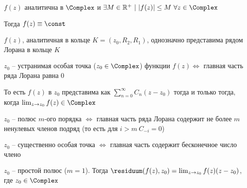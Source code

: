 \documentclass[12pt]{article}
\begin{document}
\begin{MyTheorem}
     $f(z)$ аналитична в $\Complex$ и $\exists M \in \Real^+ \ | \ |f(z)| \leq M \ \forall z \in \Complex$

    Тогда $f(z) \equiv \const$
\end{MyTheorem}

\begin{MyTheorem}
    $f(z)$, аналитичная в кольце $K = (z_0, R_2, R_1)$, однозначно представима рядом Лорана в кольце $K$
\end{MyTheorem}

\begin{MyTheorem}
     $z_0$ -- устранимая особая точка ($z_0 \in \Complex$) функции $f(z) \Longleftrightarrow$ главная часть ряда Лорана равна 0
    
    То есть $f(z)$ в $z_0$ представима как $\sum_{n = 0}^\infty C_n (z - z_0)$ тогда и только тогда, когда $\lim_{z \to z_0} f(z) \in \Complex$
\end{MyTheorem}

\begin{MyTheorem}
     $z_0$ -- полюс $m$-ого порядка $\Longleftrightarrow$ главная часть ряда Лорана содержит не более $m$ ненулевых членов подряд (то есть для $i > m \ C_{-i} = 0$) 
\end{MyTheorem}

\begin{MyTheorem}
     $z_0$ -- существенно особая точка $\Longleftrightarrow$ главная часть содержит бесконечное число члено
\end{MyTheorem}

\begin{MyTheorem}
    \Ths $z_0$ -- простой полюс ($m = 1$). Тогда $\residuum(f(z), z_0) = \lim_{z \to z_0} f(z) (z - z_0)$, где $z_0 \in \Complex$
\end{MyTheorem}
\end{document}
